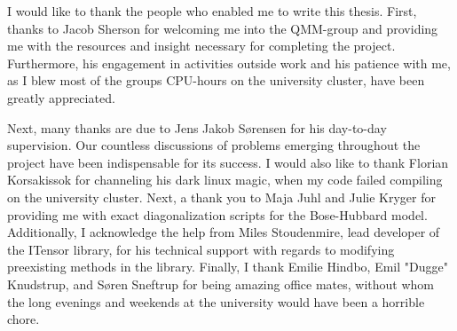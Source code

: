 \begin{acknowledgements}
\addchaptertocentry{\acknowledgementname} %

I would like to thank the people who enabled me to write this thesis. 
First, thanks to Jacob Sherson for welcoming me into the QMM-group and providing me with the resources and insight necessary for completing the project. Furthermore, his engagement in activities outside work and his patience with me, as I blew most of the groups CPU-hours on the university cluster, have been greatly appreciated.
 
Next, many thanks are due to Jens Jakob S\o rensen for his day-to-day supervision. Our countless discussions of problems emerging throughout the project have been indispensable for its success. 
I would also like to thank Florian Korsakissok for channeling his dark linux magic, when my code failed compiling on the university cluster. 
Next, a thank you to Maja Juhl and Julie Kryger for providing me with exact diagonalization scripts for the Bose-Hubbard model. 
Additionally, I acknowledge the help from Miles Stoudenmire, lead developer of the ITensor library, for his technical support with regards to modifying preexisting methods in the library. 
Finally, I thank Emilie Hindbo, Emil "Dugge" Knudstrup, and S\o ren Sneftrup for being amazing office mates, without whom the long evenings and weekends at the university would have been a horrible chore.


\end{acknowledgements}
